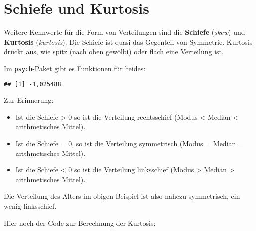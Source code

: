 \documentclass[
]{book}
\newenvironment{Shaded}{\begin{snugshade}}{\end{snugshade}}
\newcommand{\AttributeTok}[1]{\textcolor[rgb]{0.77,0.63,0.00}{#1}}
\newcommand{\ConstantTok}[1]{\textcolor[rgb]{0.00,0.00,0.00}{#1}}
\newcommand{\FunctionTok}[1]{\textcolor[rgb]{0.00,0.00,0.00}{#1}}
\newcommand{\NormalTok}[1]{#1}
\newcommand{\SpecialCharTok}[1]{\textcolor[rgb]{0.00,0.00,0.00}{#1}}
\begin{document}
\hypertarget{schiefe-und-kurtosis}{%
\section{Schiefe und Kurtosis}\label{schiefe-und-kurtosis}}

Weitere Kennwerte für die Form von Verteilungen sind die \textbf{Schiefe} (\emph{skew}) und \textbf{Kurtosis} (\emph{kurtosis}). Die Schiefe ist quasi das Gegenteil von Symmetrie. Kurtosis drückt aus, wie spitz (nach oben gewölbt) oder flach eine Verteilung ist.

Im \texttt{psych}-Paket gibt es Funktionen für beides:

\begin{Shaded}
\end{Shaded}

\begin{verbatim}
## [1] -1,025488
\end{verbatim}

Zur Erinnerung:

\begin{itemize}
\item
  Ist die Schiefe \textgreater{} 0 so ist die Verteilung rechtsschief (Modus \textless{} Median \textless{} arithmetisches Mittel).
\item
  Ist die Schiefe = 0, so ist die Verteilung symmetrisch (Modus = Median = arithmetisches Mittel).
\item
  Ist die Schiefe \textless{} 0 so ist die Verteilung linksschief (Modus \textgreater{} Median \textgreater{} arithmetisches Mittel).
\end{itemize}

Die Verteilung des Alters im obigen Beispiel ist also nahezu symmetrisch, ein wenig linksschief.

Hier noch der Code zur Berechnung der Kurtosis:

\begin{Shaded}
\end{Shaded}
\end{document}
